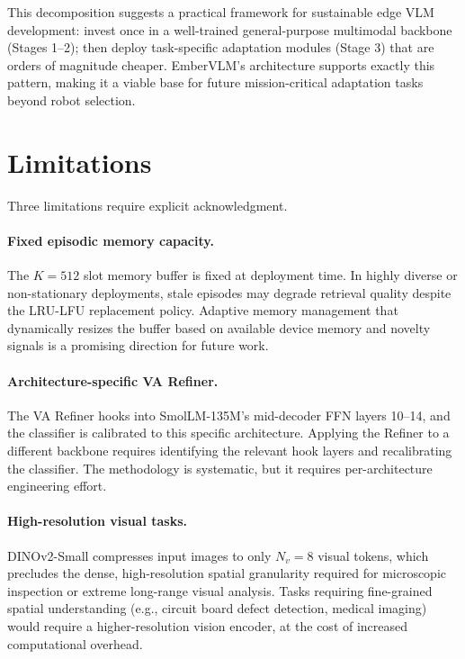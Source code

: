 This decomposition suggests a practical framework for sustainable edge VLM development: invest once in a well-trained general-purpose multimodal backbone (Stages 1--2); then deploy task-specific adaptation modules (Stage 3) that are orders of magnitude cheaper. EmberVLM's architecture supports exactly this pattern, making it a viable base for future mission-critical adaptation tasks beyond robot selection.

\section{Limitations}
\label{sec:disc_limitations}

Three limitations require explicit acknowledgment.

\paragraph{Fixed episodic memory capacity.} The $K{=}512$ slot memory buffer is fixed at deployment time. In highly diverse or non-stationary deployments, stale episodes may degrade retrieval quality despite the LRU-LFU replacement policy. Adaptive memory management that dynamically resizes the buffer based on available device memory and novelty signals is a promising direction for future work.

\paragraph{Architecture-specific VA Refiner.} The VA Refiner hooks into SmolLM-135M's mid-decoder FFN layers 10--14, and the classifier is calibrated to this specific architecture. Applying the Refiner to a different backbone requires identifying the relevant hook layers and recalibrating the classifier. The methodology is systematic, but it requires per-architecture engineering effort.

\paragraph{High-resolution visual tasks.} DINOv2-Small compresses input images to only $N_v{=}8$ visual tokens, which precludes the dense, high-resolution spatial granularity required for microscopic inspection or extreme long-range visual analysis. Tasks requiring fine-grained spatial understanding (e.g., circuit board defect detection, medical imaging) would require a higher-resolution vision encoder, at the cost of increased computational overhead.

